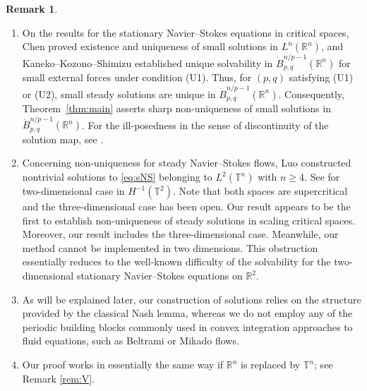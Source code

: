 \documentclass[a4paper,12pt,reqno]{amsart}
\theoremstyle{plain}
\theoremstyle{definition}
\newtheorem{rem}[thm]{Remark}
\newcommand{\dB}{\dot{B}}
\renewcommand{\geq}{\geqslant}
\newcommand{\R}{\mathbb{R}}
\newcommand{\T}{\mathbb{T}}
\begin{document}
\begin{rem}
\begin{enumerate}[label=\arabic*.]
      leads to non-uniqueness.
      Moreover, we obtain the breakdown of unconditional uniqueness for small mild solutions in 
      $L^{\infty}(0,T;{\rm BMO}^{-1}(\R^n))$ since ${\rm BMO}^{-1}(\R^n)=\dot{F}_{\infty,2}^{-1}(\R^n)$.
      This is different from the phenomenon in \cite{Coi-Pal-25}, which concerns non-uniqueness of smooth solutions
      for large data in ${\rm BMO}^{-1}(\T^3)$.
      See Figure~\ref{fig:uniq-nonuniq} below.
    \item 
      On the results for the stationary Navier--Stokes equations in critical spaces,
      Chen \cite{Che-93} proved existence and uniqueness of small solutions in $L^n(\mathbb{R}^n)$,
      and Kaneko--Kozono--Shimizu \cite{Kan-Koz-Shi-19} established unique solvability in
      $\dot{B}_{p,q}^{n/p-1}(\mathbb{R}^n)$ for small external forces under condition (U1).
      Thus, for $(p,q)$ satisfying (U1) or (U2), small steady solutions are unique in $\dB_{p,q}^{n/p-1}(\R^n)$.
      Consequently, Theorem~\ref{thm:main} asserts sharp non-uniqueness of small solutions in $\dot{B}_{p,q}^{n/p-1}(\mathbb{R}^n)$.
      For the ill-posedness in the sense of discontinuity of the solution map, see \cites{Tsu-19-ARMA,Li-Yu-Zhu-25,Tan-Tsu-Zha-25,Fuj-24}.
    \item Concerning non-uniqueness for steady Navier--Stokes flows, Luo \cite{Luo-ARMA-2019}
      constructed nontrivial solutions to \eqref{eq:sNS} belonging to $L^2(\mathbb{T}^n)$ with $n \geq 4$.
      See \cite{Rieusset-25-JFA} for two-dimensional case in $H^{-1}(\T^2)$.
      Note that both spaces are supercritical and the three-dimensional case has been open.
      Our result appears to be the first to establish non-uniqueness of steady solutions in scaling critical spaces. Moreover, our result includes the three-dimensional case.
      Meanwhile, our method cannot be implemented in two dimensions. 
      This obstruction essentially reduces to the well-known difficulty of the solvability for the two-dimensional stationary Navier--Stokes equations on $\R^2$.  
    \item 
    As will be explained later, our construction of solutions relies on the structure provided by the classical Nash lemma, whereas we do not employ any of the periodic building blocks commonly used in convex integration approaches to fluid equations, such as Beltrami or Mikado flows. 
    \item 
    Our proof works in essentially the same way if $\mathbb{R}^n$ is replaced by $\mathbb{T}^n$; see Remark \ref{rem:V}.
\end{enumerate}
\end{rem}
\end{document}
